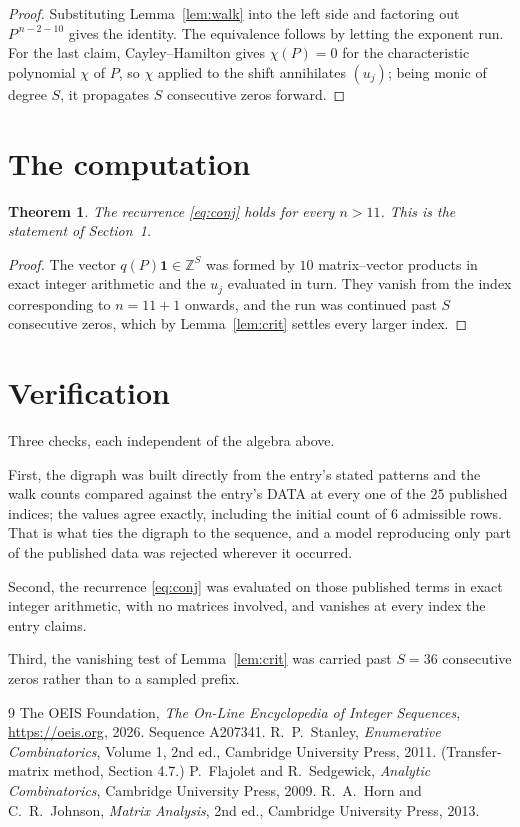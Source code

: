 \documentclass[11pt,a4paper]{article}
\theoremstyle{plain}
\newtheorem{theorem}{Theorem}
\theoremstyle{definition}
\begin{document}
\begin{proof}
Substituting Lemma~\ref{lem:walk} into the left side and factoring out
$P^{\,n-2-10}$ gives the identity. The equivalence follows by letting the exponent
run. For the last claim, Cayley--Hamilton gives $\chi(P)=0$ for the characteristic
polynomial $\chi$ of $P$, so $\chi$ applied to the shift annihilates $(u_j)$; being monic of
degree $S$, it propagates $S$ consecutive zeros forward.
\end{proof}

\section{The computation}

\begin{theorem}
The recurrence \eqref{eq:conj} holds for every $n>11$. This is the statement of
Section~1.
\end{theorem}

\begin{proof}
The vector $q(P)\mathbf{1}\in\mathbb{Z}^{S}$ was formed by $10$ matrix--vector
products in exact integer arithmetic and the $u_j$ evaluated in turn. They vanish from the
index corresponding to $n=11+1$ onwards, and the run was continued past $S$ consecutive
zeros, which by Lemma~\ref{lem:crit} settles every larger index.
\end{proof}

\section{Verification}

Three checks, each independent of the algebra above.

First, the digraph was built directly from the entry's stated patterns and the walk counts
compared against the entry's DATA at every one of the $25$ published indices; the
values agree exactly, including the initial count of $6$ admissible rows. That is
what ties the digraph to the sequence, and a model reproducing only part of the published
data was rejected wherever it occurred.

Second, the recurrence \eqref{eq:conj} was evaluated on those published terms in exact
integer arithmetic, with no matrices involved, and vanishes at every index the entry claims.

Third, the vanishing test of Lemma~\ref{lem:crit} was carried past $S=36$ consecutive
zeros rather than to a sampled prefix.

\begin{thebibliography}{9}
 The OEIS Foundation, \emph{The On-Line Encyclopedia of Integer
Sequences}, \url{https://oeis.org}, 2026. Sequence A207341.
 R.~P.~Stanley, \emph{Enumerative Combinatorics}, Volume 1, 2nd ed.,
Cambridge University Press, 2011. (Transfer-matrix method, Section 4.7.)
 P.~Flajolet and R.~Sedgewick, \emph{Analytic Combinatorics}, Cambridge
University Press, 2009.
 R.~A.~Horn and C.~R.~Johnson, \emph{Matrix Analysis}, 2nd ed., Cambridge
University Press, 2013.
\end{thebibliography}
\end{document}
